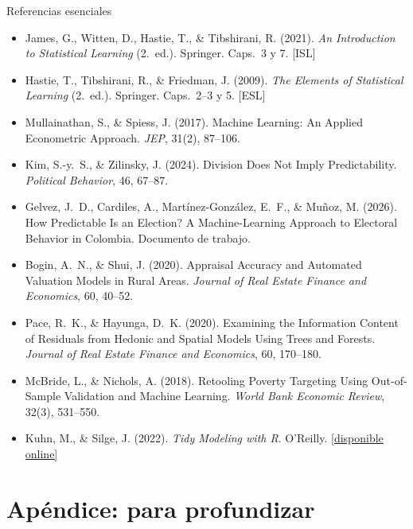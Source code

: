 \documentclass{beamer}
\newcommand{\1}{\mathbb{I}}
\begin{document}
\begin{frame}{Referencias esenciales}
\scriptsize
\begin{itemize}\itemsep2pt
  \item James, G., Witten, D., Hastie, T., \& Tibshirani, R. (2021). \emph{An Introduction to Statistical Learning} (2.\ ed.). Springer. Caps.\ 3 y 7. [ISL]
  \item Hastie, T., Tibshirani, R., \& Friedman, J. (2009). \emph{The Elements of Statistical Learning} (2.\ ed.). Springer. Caps.\ 2--3 y 5. [ESL]
  \item Mullainathan, S., \& Spiess, J. (2017). Machine Learning: An Applied Econometric Approach. \emph{JEP}, 31(2), 87--106.
  \item Kim, S.-y.\ S., \& Zilinsky, J. (2024). Division Does Not Imply Predictability. \emph{Political Behavior}, 46, 67--87.
  \item Gelvez, J.\ D., Cardiles, A., Martínez-González, E.\ F., \& Muñoz, M. (2026). How Predictable Is an Election? A Machine-Learning Approach to Electoral Behavior in Colombia. Documento de trabajo.
  \item Bogin, A.\ N., \& Shui, J. (2020). Appraisal Accuracy and Automated Valuation Models in Rural Areas. \emph{Journal of Real Estate Finance and Economics}, 60, 40--52.
  \item Pace, R.\ K., \& Hayunga, D.\ K. (2020). Examining the Information Content of Residuals from Hedonic and Spatial Models Using Trees and Forests. \emph{Journal of Real Estate Finance and Economics}, 60, 170--180.
  \item McBride, L., \& Nichols, A. (2018). Retooling Poverty Targeting Using Out-of-Sample Validation and Machine Learning. \emph{World Bank Economic Review}, 32(3), 531--550.
  \item Kuhn, M., \& Silge, J. (2022). \emph{Tidy Modeling with R}. O'Reilly. \href{https://www.tmwr.org}{[disponible online]}
\end{itemize}
\normalsize
\end{frame}


\appendix
\section{Apéndice: para profundizar}
\begin{frame}[noframenumbering]
\tableofcontents[currentsection]
\end{frame}
\end{document}
